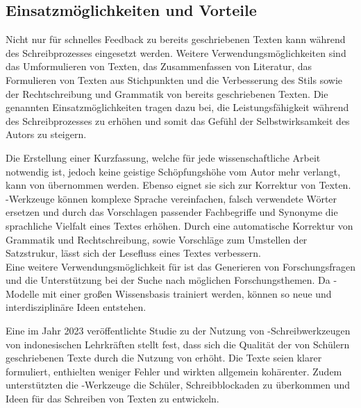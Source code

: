 \documentclass[../main.tex]{subfiles}
\begin{document}
\subsection{Einsatzmöglichkeiten und Vorteile}
\label{sec:vorteile}

Nicht nur für schnelles Feedback zu bereits geschriebenen Texten kann  während des Schreibprozesses eingesetzt werden. 
Weitere Verwendungsmöglichkeiten sind das Umformulieren von Texten, das Zusammenfassen von Literatur, das Formulieren von Texten aus Stichpunkten und die Verbesserung des Stils sowie der Rechtschreibung und Grammatik von bereits geschriebenen Texten. Die genannten Einsatzmöglichkeiten 
tragen dazu bei, die Leistungsfähigkeit während des Schreibprozesses zu erhöhen und somit das Gefühl der Selbstwirksamkeit des Autors zu steigern.\cite{SelfEfficacyBeliefs}

Die Erstellung einer Kurzfassung, welche für jede wissenschaftliche Arbeit notwendig ist, jedoch keine geistige Schöpfungshöhe vom Autor mehr verlangt, 
kann von  übernommen werden. Ebenso eignet sie sich zur Korrektur von Texten. -Werkzeuge können komplexe Sprache vereinfachen, falsch 
verwendete Wörter ersetzen und durch das Vorschlagen passender Fachbegriffe und Synonyme die sprachliche Vielfalt eines Textes erhöhen. Durch eine 
automatische Korrektur von Grammatik und Rechtschreibung, sowie Vorschläge zum Umstellen der Satzstrukur, lässt sich der Lesefluss eines Textes verbessern.\cite{ZukunftWissenschaftlichesPublizieren,teachers}\\
Eine weitere Verwendungsmöglichkeit für  ist das Generieren von Forschungsfragen und die Unterstützung bei der Suche nach möglichen Forschungsthemen. Da -Modelle mit einer großen Wissensbasis trainiert werden, 
können so neue und interdisziplinäre Ideen entstehen.\cite{ZukunftWissenschaftlichesPublizieren,humanWritingToAi}

Eine im Jahr 2023 veröffentlichte Studie zu der Nutzung von -Schreibwerkzeugen von indonesischen Lehrkräften stellt fest, dass sich die Qualität der von 
Schülern geschriebenen Texte durch die Nutzung von  erhöht. Die Texte seien klarer formuliert, enthielten weniger Fehler und 
wirkten allgemein kohärenter. Zudem unterstützten die -Werkzeuge die Schüler, Schreibblockaden zu überkommen und Ideen für das Schreiben von Texten zu entwickeln.\cite{teachers} 
\end{document}
